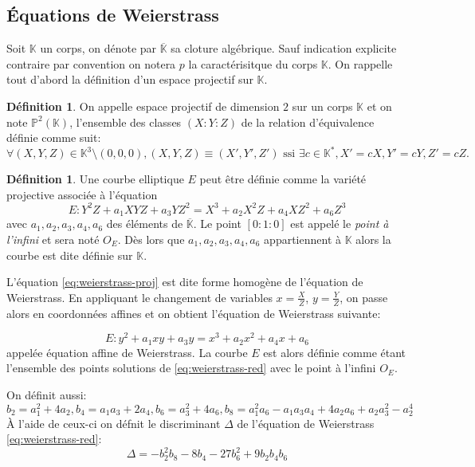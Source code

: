 \documentclass[10pt,a4paper]{book}
\theoremstyle{plain}
\theoremstyle{definition}
\theoremstyle{definition}
\theoremstyle{definition}
\theoremstyle{definition}
\newtheorem{defi}[thm]{Définition}
\theoremstyle{remark}
\theoremstyle{remark}
\theoremstyle{definition}
\begin{document}
\subsection{\'Equations de Weierstrass}

Soit $\mathbb{K}$ un corps, on dénote par $\overline{\mathbb{K}}$ sa cloture algébrique. Sauf indication explicite contraire par convention on notera $p$ la caractérisitque du corps $\mathbb{K}$. On rappelle tout d'abord  la définition d'un espace projectif sur $\mathbb{K}$.

\begin{defi}
On appelle espace projectif de dimension $2$ sur un corps $\mathbb{K}$ et on note $\mathbb{P}^2(\mathbb{K})$, l'ensemble des classes $(X:Y:Z)$ de la relation d'équivalence définie comme suit:
\begin{equation*}
\forall (X,Y,Z) \in \mathbb{K}^3 \setminus (0,0,0), (X,Y,Z) \equiv (X',Y',Z') \text{ ssi }\exists c \in \mathbb{K}^*, X'=cX, Y'=cY, Z'=cZ.
\end{equation*}
\end{defi}

\begin{defi}
Une courbe elliptique $E$ peut être définie comme la variété projective associée à l'équation
\begin{equation}
\label{eq:weierstrass-proj}
E:Y^2Z+a_1XYZ+a_3YZ^2=X^3+a_2X^2Z+a_4XZ^2+a_6Z^3
\end{equation}
avec $a_1,a_2,a_3,a_4,a_6$ des éléments de $\overline{\mathbb{K}}$. Le point $[0:1:0]$ est appelé le \emph{point à l'infini} et sera noté $O_E$. Dès lors que $a_1,a_2,a_3,a_4,a_6$ appartiennent à $\mathbb{K}$ alors la courbe est dite définie sur $\mathbb{K}$.
\end{defi}

L'équation \eqref{eq:weierstrass-proj} est dite forme homogène de l'équation de Weierstrass. En appliquant le changement de variables $x=\frac{X}{Z}$, $y=\frac{Y}{Z}$, on passe alors en coordonnées affines et on obtient l'équation de Weierstrass suivante:

\begin{equation}
\label{eq:weierstrass-red}
E:y^2+a_1xy+a_3y=x^3+a_2x^2+a_4x+a_6
\end{equation}
appelée équation affine de Weierstrass. La courbe $E$ est alors définie comme étant l'ensemble des points solutions de \eqref{eq:weierstrass-red} avec le point à l'infini $O_E$.

 On définit aussi:
\begin{equation*}
b_2=a_1^2+4a_2, b_4=a_1a_3+2a_4, b_6=a_3^2+4a_6, b_8=a_1^2a_6-a_1a_3a_4+4a_2a_6+a_2a_3^2-a_2^4
\end{equation*}
\`A l'aide de ceux-ci on défnit le discriminant $\Delta$ de l'équation de Weierstrass \eqref{eq:weierstrass-red}:
\begin{equation*}
\Delta = -b_2^2b_8-8b_4-27b_6^2+9b_2b_4b_6
\end{equation*}
\end{document}
